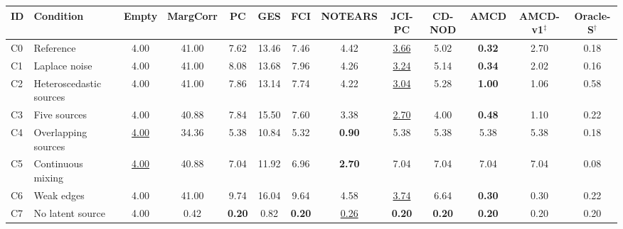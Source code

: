 \begin{tabular}{llccccccccccc}
\toprule
ID & Condition & Empty & MargCorr & PC & GES & FCI & NOTEARS & JCI-PC & CD-NOD & AMCD & AMCD-v1$^\ddagger$ & Oracle-S$^\dagger$ \\
\midrule
C0 & Reference & 4.00 & 41.00 & 7.62 & 13.46 & 7.46 & 4.42 & \underline{3.66} & 5.02 & \textbf{0.32} & 2.70 & 0.18 \\
C1 & Laplace noise & 4.00 & 41.00 & 8.08 & 13.68 & 7.96 & 4.26 & \underline{3.24} & 5.14 & \textbf{0.34} & 2.02 & 0.16 \\
C2 & Heteroscedastic sources & 4.00 & 41.00 & 7.86 & 13.14 & 7.74 & 4.22 & \underline{3.04} & 5.28 & \textbf{1.00} & 1.06 & 0.58 \\
C3 & Five sources & 4.00 & 40.88 & 7.84 & 15.50 & 7.60 & 3.38 & \underline{2.70} & 4.00 & \textbf{0.48} & 1.10 & 0.22 \\
C4 & Overlapping sources & \underline{4.00} & 34.36 & 5.38 & 10.84 & 5.32 & \textbf{0.90} & 5.38 & 5.38 & 5.38 & 5.38 & 0.18 \\
C5 & Continuous mixing & \underline{4.00} & 40.88 & 7.04 & 11.92 & 6.96 & \textbf{2.70} & 7.04 & 7.04 & 7.04 & 7.04 & 0.08 \\
C6 & Weak edges & 4.00 & 41.00 & 9.74 & 16.04 & 9.64 & 4.58 & \underline{3.74} & 6.64 & \textbf{0.30} & 0.30 & 0.22 \\
C7 & No latent source & 4.00 & 0.42 & \textbf{0.20} & 0.82 & \textbf{0.20} & \underline{0.26} & \textbf{0.20} & \textbf{0.20} & \textbf{0.20} & 0.20 & 0.20 \\
\bottomrule
\end{tabular}
